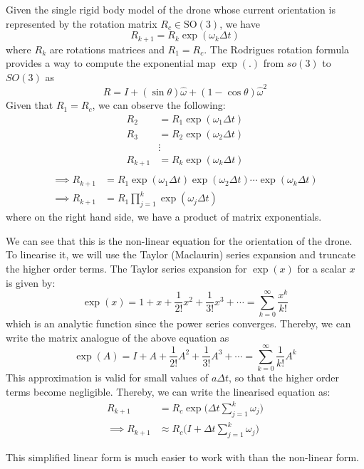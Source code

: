 Given the single rigid body model of the drone whose current orientation is represented by the rotation matrix \( R_c \in \text{SO}(3) \), we have
\begin{equation*}
    R_{k+1}
    =
    R_k \exp(\omega_k \Delta t)
\end{equation*}
where \( R_k \) are rotations matrices and \( R_{1} = R_c \).
The Rodrigues rotation formula provides a way to compute the exponential map \( \exp(.) \) from \(so(3)\) to \(SO(3)\) as
\[
    R = I +(\sin \theta )\hat\omega +(1-\cos \theta )\hat\omega^2
\]
Given that \( R_{1} = R_c \), we can observe the following:
\begin{align*}
    R_{2}
     & =
    R_{1} \exp(\omega_1 \Delta t)
    \\
    R_{3}
     & =
    R_{2} \exp(\omega_2 \Delta t)
    \\ &
    \vdots
    \\
    R_{k+1}
     & =
    R_{k} \exp(\omega_k \Delta t)
    \\
\end{align*}
\begin{align*}
    \implies
    R_{k+1}
     & =
    R_1 \exp(\omega_1 \Delta t) \exp(\omega_2 \Delta t) \cdots \exp(\omega_k \Delta t)
    \\
    \implies
    R_{k+1}
     & =
    R_1 \prod_{j=1}^{k} \exp(\omega_j \Delta t)
\end{align*}
where on the right hand side, we have a product of matrix exponentials.

We can see that this is the non-linear equation for the orientation of the drone.
To linearise it, we will use the Taylor (Maclaurin) series expansion and truncate the higher order terms.
The Taylor series expansion for \( \exp(x) \) for a scalar \( x \) is given by:
\begin{equation*}
    \exp(x)
    =
    1 + x + \frac{1}{2!} x^2 + \frac{1}{3!} x^3 + \cdots
    =
    \sum_{k=0}^{\infty} \frac{x^k}{k!}
\end{equation*}
which is an analytic function since the power series converges.
Thereby, we can write the matrix analogue of the above equation as
\begin{equation*}
    \exp(A)
    =
    I + A + \frac{1}{2!} A^2 + \frac{1}{3!} A^3 + \cdots
    =
    \sum_{k=0}^{\infty} \frac{1}{k!} A^k
\end{equation*}
This approximation is valid for small values of \( a \Delta t \), so that the higher order terms become negligible.
Thereby, we can write the linearised equation as:
\begin{align*}
    R_{k+1}
     & =
    R_c \exp \Big( \Delta t \sum_{j=1}^{k} \omega_j \Big)
    \\
    \implies
    R_{k+1}
     & \approx
    R_c \Big( I + \Delta t \sum_{j=1}^{k} \omega_j \Big)
\end{align*}

This simplified linear form is much easier to work with than the non-linear form.
